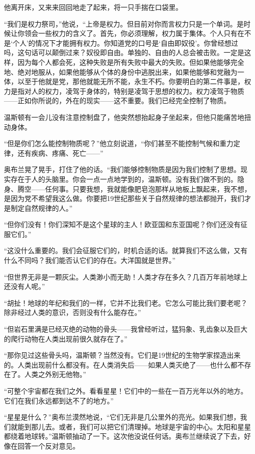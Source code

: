 他离开床，又来来回回地走了起来，将一只手揣在口袋里。

``我们是权力祭司，''他说，``上帝是权力。但目前对你而言权力只是一个单词。是时候让你领会一些权力的含义了。首先，你必须理解，权力属于集体。个人只有在不是`个人'的情况下才能拥有权力。你知道党的口号是`自由即奴役'。你曾经想过吗，这句话可以颠倒过来？奴役即自由。单独的、自由的人总会被击败。一定是这样，因为每个人都会死，这种失败是所有失败中最大的失败。但如果他能够完全地、绝对地服从，如果他能够从个体的身份中逃脱出来，如果他能够和党融为一体，以至于他就是党，那他就能无所不能，永生不朽。你要明白的第二件事是，权力是指对人的权力，凌驾于身体的，特别是凌驾于思想的权力。权力凌驾于物质——正如你所说的，外在的现实——这不重要。我们已经完全控制了物质。

温斯顿有一会儿没有注意控制盘了，他突然想抬起身子坐起来，但他只能痛苦地扭动身体。

``但是你们怎么能控制物质呢？''他立刻说道，``你们甚至不能控制气候和重力定律，还有疾病、疼痛、死亡——''

奥布兰晃了晃手，打住了他的话。``我们能够控制物质是因为我们控制了思想。现实存在于人的头脑里。你会一点一点地学到的，温斯顿。没有我们做不到的。隐身、腾空——任何事。只要我想，我就能像肥皂泡那样从地板上飘起来，我不想，是因为党不希望我这么做。你要把19世纪那些关于自然规律的想法都抛开，我们才是制定自然规律的人。''

``但你们没有！你们深知不是这个星球的主人！欧亚国和东亚国呢？你们还没有征服它们。''

``这没什么重要的。我们会征服它们的，时机合适的话。就算我们不这么做，又有什么不同吗？我们能否认它们的存在。大洋国就是世界。''

``但世界无非是一颗灰尘。人类渺小而无助！人类才存在多久？几百万年前地球上还没有人呢。''

``胡扯！地球的年纪和我们的一样，它并不比我们老。它怎么可能比我们要老呢？除非经过人类的意识，否则没有什么能存在。''

``但岩石里满是已经灭绝的动物的骨头——我曾经听过，猛犸象、乳齿象以及巨大的爬行动物在人类出现前很久就存在了。''

``那你见过这些骨头吗，温斯顿？当然没有。它们是19世纪的生物学家捏造出来的。人类出现前什么都没有。在人类消失后——如果人类灭绝了——也什么都不存在了。人类之外别无他物。''

``可整个宇宙都在我们之外。看看星星！它们中的一些在一百万光年以外的地方。它们在我们永远都到达不了的地方。''

``星星是什么？''奥布兰漠然地说，``它们无非是几公里外的亮光。如果我们想，我们就能到那儿去。或者，我们可以把它们清理掉。地球是宇宙的中心。太阳和星星都绕着地球转。''温斯顿抽动了一下。这次他没说任何话。奥布兰继续说了下去，好像在回答一个反对意见。

